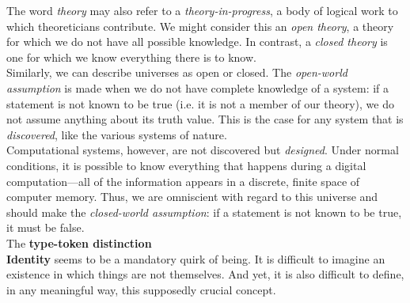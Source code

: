 The word \textit{theory} may also refer to a \textit{theory-in-progress}, a body of logical work to which theoreticians contribute. We might consider this an \textit{open theory}, a theory for which we do not have all possible knowledge. In contrast, a \textit{closed theory} is one for which we know everything there is to know. \\

Similarly, we can describe universes as open or closed. The \textit{open-world assumption} is made when we do not have complete knowledge of a system: if a statement is not known to be true (i.e. it is not a member of our theory), we do not assume anything about its truth value. This is the case for any system that is \textit{discovered}, like the various systems of nature. \\

Computational systems, however, are not discovered but \textit{designed}. Under normal conditions, it is possible to know everything that happens during a digital computation---all of the information appears in a discrete, finite space of computer memory. Thus, we are omniscient with regard to this universe and should make the \textit{closed-world assumption}: if a statement is not known to be true, it must be false. \\


The \textbf{type-token distinction} \\




\textbf{Identity} seems to be a mandatory quirk of being. It is difficult to imagine an existence in which things are not themselves. And yet, it is also difficult to define, in any meaningful way, this supposedly crucial concept. \\



